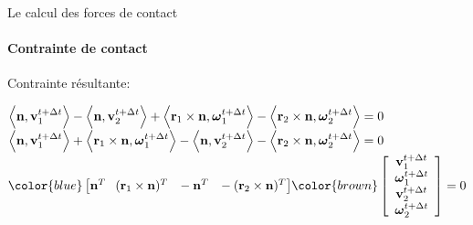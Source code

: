 \begin{frame}{Le calcul des forces de contact}
    \framesubtitle{Contrainte de contact}
    \begin{description}
        \item[Contrainte résultante:]
    \end{description}
    \begin{math}
        \left< {\bf n}, {\bf v}_1^{t + \Delta t} \right> -
        \left< {\bf n}, {\bf v}_2^{t + \Delta t} \right> +
        \left<{\bf r}_1 \times {\bf n}, \boldsymbol\omega_1^{t + \Delta t} \right> -
        \left<{\bf r}_2 \times {\bf n}, \boldsymbol\omega_2^{t + \Delta t} \right>
        = 0
    \end{math}
    \pause
    \mbox{}\\[1em]
    \begin{math}
        \left< {\bf n}, {\bf v}_1^{t + \Delta t} \right> +
        \left<{\bf r}_1 \times {\bf n}, \boldsymbol\omega_1^{t + \Delta t} \right> -
        \left< {\bf n}, {\bf v}_2^{t + \Delta t} \right> -
        \left<{\bf r}_2 \times {\bf n}, \boldsymbol\omega_2^{t + \Delta t} \right>
        = 0
    \end{math}
    \pause
    \mbox{}\\[1em]
    \begin{math}
        {
            \color{blue}
        \left[
            \n^T               \hspace{0.75em}
            (\r_1 \times \n)^T \hspace{0.75em}
            -\n^T              \hspace{0.75em}
            -(\r_2 \times \n)^T
        \right]
        }
        {
            \color{brown}
        \left[
            \begin{array}{c}
            \v_1^{t + \Delta t}      \\
            \bomega_1^{t + \Delta t} \\
            \v_2^{t + \Delta t}      \\
            \bomega_2^{t + \Delta t}
            \end{array}
        \right]
        }
        = 0
    \end{math}
    \pause
    \mbox{}\\[1em]
    \begin{center}
    \end{center}
\end{frame}

